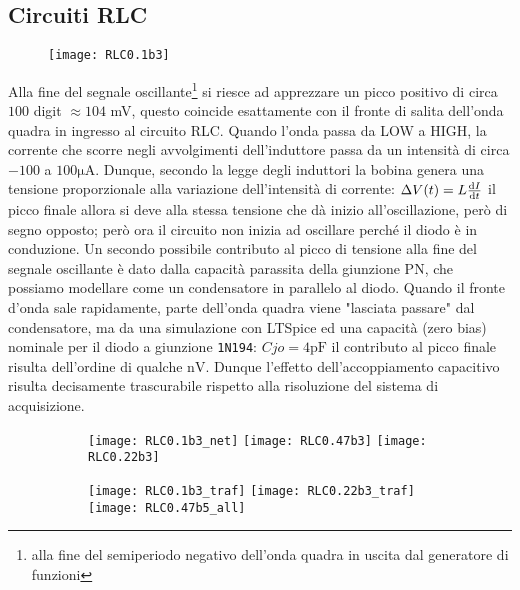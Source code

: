 \documentclass{article}[a4paper, oneside, 11pt]
\begin{document}
\subsection{Circuiti RLC}
\begin{figure}[!htb]
\centering
	\texttt{[image: RLC0.1b3]}
\label{fig: RLC0.1b3}
\end{figure}

Alla fine del segnale oscillante\footnote{alla fine del
semiperiodo negativo dell'onda quadra in uscita dal generatore di funzioni}
si riesce ad apprezzare un picco positivo di circa $100$ digit $\approx 104$ mV,
questo coincide esattamente con il fronte di salita dell'onda quadra in
ingresso al circuito RLC.
Quando l'onda passa da LOW a HIGH, la corrente che scorre negli avvolgimenti
dell'induttore passa da un intensità di circa $-100$ a $100 \si{\micro\A}$.
Dunque, secondo la legge degli induttori la bobina genera una tensione
proporzionale alla variazione dell'intensità di corrente:
$\Delta V(t) = L \frac{\mathrm{d} I}{\mathrm{d} t}$
il picco finale allora si deve alla stessa tensione che dà inizio
all'oscillazione, però di segno opposto; però ora il circuito non inizia
ad oscillare perché il diodo è in conduzione.
Un secondo possibile contributo al picco di tensione alla
fine del segnale oscillante è dato dalla capacità parassita
della giunzione PN, che possiamo  modellare come un condensatore
in parallelo al diodo. Quando il fronte d'onda sale rapidamente, parte
dell'onda quadra viene "lasciata passare" dal condensatore, ma da 
una simulazione con LTSpice ed una capacità (zero bias) nominale per
il diodo a giunzione \texttt{1N194}: $Cjo = 4 \si{\pico\farad}$
il contributo al picco finale risulta dell'ordine di qualche $\si{\nano\V}$.
Dunque l'effetto dell'accoppiamento capacitivo risulta decisamente trascurabile
rispetto alla risoluzione del sistema di acquisizione.
\begin{figure}[!htb]
\centering
	\begin{subfigure}{.5\textwidth}
		\texttt{[image: RLC0.1b3\_net]} 
		\texttt{[image: RLC0.47b3]} 
		\texttt{[image: RLC0.22b3]} 
	\end{subfigure}%
	\begin{subfigure}{.5\textwidth}
		\texttt{[image: RLC0.1b3\_traf]}
		\texttt{[image: RLC0.22b3\_traf]}
		\texttt{[image: RLC0.47b5\_all]}
	\end{subfigure}%
\label{fig: RLCall}
\end{figure}
\end{document}
